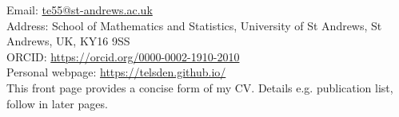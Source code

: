 \documentclass[11pt,a4paper]{article} %
\begin{document}
 



\vspace{0.25cm}

\noindent Email: \href{mailto:te55@st-andrews.ac.uk}{te55@st-andrews.ac.uk} %
\\
Address: School of Mathematics and Statistics, University of St Andrews, St Andrews, UK, KY16 9SS %
\\ 
ORCID: \href{https://orcid.org/0000-0002-1910-2010}{https://orcid.org/0000-0002-1910-2010} \\
Personal webpage: \href{https://telsden.github.io/}{https://telsden.github.io/} \\

\vspace{0.1cm}
\noindent This front page provides a concise form of my CV. Details e.g. publication list, follow in later pages.


\spacedhrule{0.9em}{-0.4em} %


\end{document}
